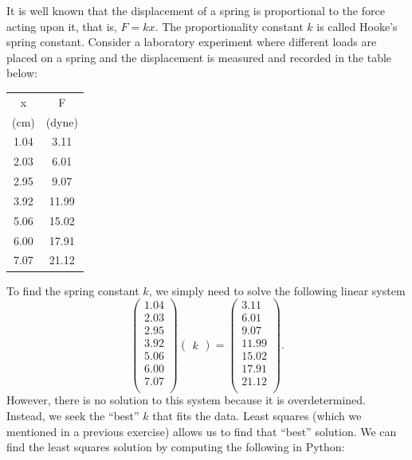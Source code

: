 It is well known that the displacement of a spring is proportional to the force acting upon it, that is, $F = k x$.  The proportionality constant $k$ is called Hooke's spring constant.  Consider a laboratory experiment where different loads are placed on a spring and the displacement is measured and recorded in the table below:
\vspace{5mm}\\
\begin{center}
\begin{tabular}{|c|c|}
	\hline
x & F \\
(cm) & (dyne)\\
\hline
1.04  & 3.11 \\
2.03  &  6.01\\
2.95  &  9.07\\
3.92  &  11.99\\
5.06  &  15.02\\
6.00  &  17.91\\
7.07  &  21.12\\
\hline
\end{tabular}
\end{center}
\vspace{5mm}
To find the spring constant $k$, we simply need to solve the following linear system
\[
\begin{pmatrix}
1.04\\
2.03\\
2.95\\
3.92\\
5.06\\
6.00\\
7.07\\
\end{pmatrix}
\begin{pmatrix}k\end{pmatrix} = 
\begin{pmatrix}
3.11 \\
6.01\\
9.07\\
11.99\\
15.02\\
17.91\\
21.12\\
\end{pmatrix}.
\]
However, there is no solution to this system because it is overdetermined.  Instead, we seek the ``best'' $k$ that fits the data.  Least squares (which we mentioned in a previous exercise) allows us to find that ``best'' solution. We can find the least squares solution by computing the following in Python:
